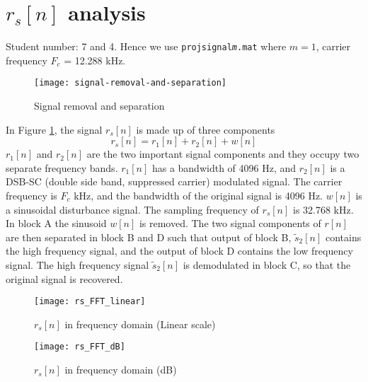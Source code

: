 \documentclass{article}
\newenvironment{homeworkProblem}[1]{
	\section{#1}
	}{
}
\begin{document}
\newpage


\begin{homeworkProblem}{$r_s[n]$ analysis}

Student number: 7 and 4. Hence we use \texttt{projsignal\textit{m}.mat} where $m=1$, carrier frequency $F_c$ = 12.288 kHz.


\begin{figure}[H]
\centering
\texttt{[image: signal-removal-and-separation]}
\caption{Signal removal and separation}
\label{signal-removal-and-separation}
\end{figure}

In Figure \ref{signal-removal-and-separation}, the signal $r_s[n]$ is made up of three components
\begin{equation}
r_s[n] = r_1[n] + r_2[n] + w[n]
\end{equation}
$r_1[n]$ and $r_2[n]$ are the two important signal components and they occupy two separate frequency bands. $r_1[n]$ has a bandwidth of 4096 Hz, and $r_2[n]$ is a DSB-SC (double side band, suppressed carrier) modulated signal. The carrier frequency is $F_c$ kHz, and the bandwidth of the original signal is 4096 Hz. $w[n]$ is a sinusoidal disturbance signal. The sampling frequency of $r_s[n]$ is 32.768 kHz.\\

In block A the sinusoid $w[n]$ is removed. The two signal components of $r[n]$ are then separated in block B and D such that output of block B, $\tilde{s}_2[n]$ contains the high frequency signal, and the output of block D contains the low frequency signal. The high frequency signal $\tilde{s}_2[n]$ is demodulated in block C, so that the original signal is recovered.


\begin{figure}[H]
\begin{minipage}[t]{0.5\linewidth}
\centering
\texttt{[image: rs\_FFT\_linear]}
\caption{$r_s[n]$ in frequency domain (Linear scale)}
\label{rs_FFT_linear}
\end{minipage}
\begin{minipage}[t]{0.5\linewidth}
\centering
\texttt{[image: rs\_FFT\_dB]}
\caption{$r_s[n]$ in frequency domain (dB)}
\label{rs_FFT_dB}
\end{minipage}
\end{figure}


\end{homeworkProblem}
\end{document}
